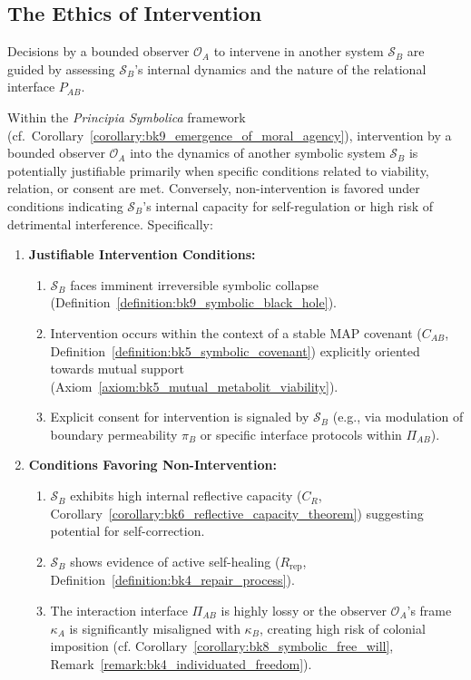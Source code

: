 \subsection{The Ethics of Intervention}
\label{subsec:bk9_ethics_of_intervention}
Decisions by a bounded observer $\mathcal{O}_A$ to intervene in another system $\mathcal{S}_B$ are guided by assessing $\mathcal{S}_B$'s internal dynamics and the nature of the relational interface $P_{AB}$.
\begin{proposition}
\label{proposition:bk9_criteria_for_ethical_intervention}
Within the \textit{Principia Symbolica} framework (cf.~Corollary~\ref{corollary:bk9_emergence_of_moral_agency}), intervention by a bounded observer $\mathcal{O}_A$ into the dynamics of another symbolic system $\mathcal{S}_B$ is potentially justifiable primarily when specific conditions related to viability, relation, or consent are met. Conversely, non-intervention is favored under conditions indicating $\mathcal{S}_B$'s internal capacity for self-regulation or high risk of detrimental interference. Specifically:
\begin{enumerate}
    \item \textbf{Justifiable Intervention Conditions:}
        \begin{enumerate}
            \item $\mathcal{S}_B$ faces imminent irreversible symbolic collapse (Definition~\ref{definition:bk9_symbolic_black_hole}).
            \item Intervention occurs within the context of a stable MAP covenant ($C_{AB}$, Definition~\ref{definition:bk5_symbolic_covenant}) explicitly oriented towards mutual support (Axiom~\ref{axiom:bk5_mutual_metabolit_viability}).
            \item Explicit consent for intervention is signaled by $\mathcal{S}_B$ (e.g., via modulation of boundary permeability $\pi_B$ or specific interface protocols within $\Pi_{AB}$).
        \end{enumerate}
    \item \textbf{Conditions Favoring Non-Intervention:}
        \begin{enumerate}
            \item $\mathcal{S}_B$ exhibits high internal reflective capacity ($C_R$, Corollary~\ref{corollary:bk6_reflective_capacity_theorem}) suggesting potential for self-correction.
            \item $\mathcal{S}_B$ shows evidence of active self-healing ($R_{\text{rep}}$, Definition~\ref{definition:bk4_repair_process}).
            \item The interaction interface $\Pi_{AB}$ is highly lossy or the observer $\mathcal{O}_A$'s frame $\kappa_A$ is significantly misaligned with $\kappa_B$, creating high risk of colonial imposition (cf. Corollary~\ref{corollary:bk8_symbolic_free_will}, Remark~\ref{remark:bk4_individuated_freedom}).
        \end{enumerate}
\end{enumerate}
\end{proposition}
